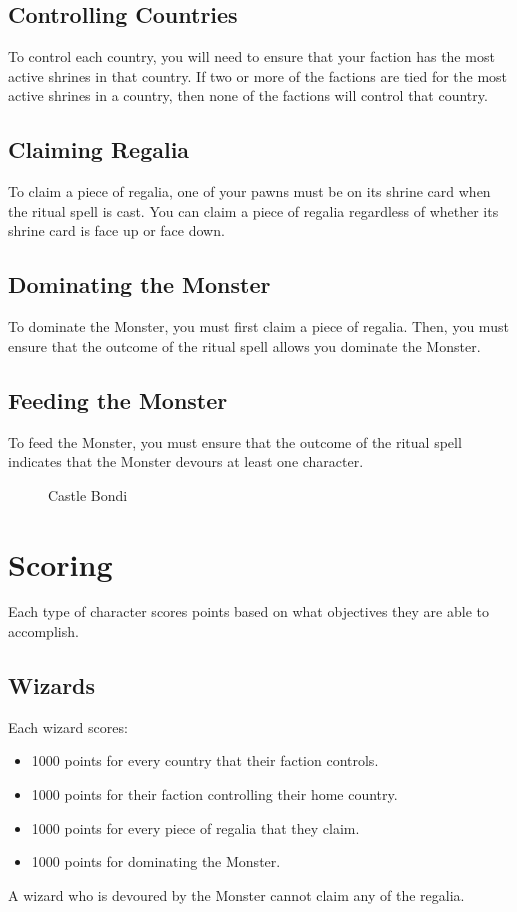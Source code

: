 \documentclass[10pt, parskip=half-, twoside]{scrartcl}
\begin{document}
\subsection*{Controlling Countries}
To control each country, you will need to ensure that your faction has the most active shrines in that country. If two or more of the factions are tied for the most active shrines in a country, then none of the factions will control that country.

\subsection*{Claiming Regalia}
To claim a piece of regalia, one of your pawns must be on its shrine card when the ritual spell is cast. You can claim a piece of regalia regardless of whether its shrine card is face up or face down.

\newpage

\subsection*{Dominating the Monster}
To dominate the Monster, you must first claim a piece of regalia. Then, you must ensure that the outcome of the ritual spell allows you dominate the Monster.

\subsection*{Feeding the Monster}
To feed the Monster, you must ensure that the outcome of the ritual spell indicates that the Monster devours at least one character.

\begin{figure}[h]
\centering
{}
\caption*{Castle Bondi}
\end{figure}

\newpage

\section*{Scoring}
Each type of character scores points based on what objectives they are able to accomplish.

\subsection*{Wizards}
Each wizard scores:
\begin{itemize}[itemindent=*, leftmargin=*]
\item 1000 points for every country that their faction controls.
\item 1000 points for their faction controlling their home country.
\item 1000 points for every piece of regalia that they claim.
\item 1000 points for dominating the Monster.
\end{itemize}
A wizard who is devoured by the Monster cannot claim any of the regalia.
\end{document}
